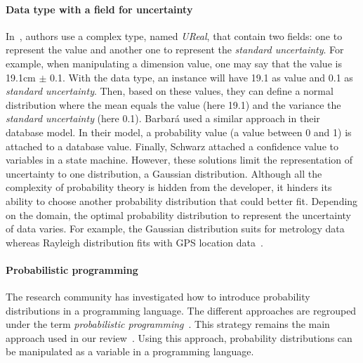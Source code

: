 \paragraph{Data type with a field for uncertainty}
In~\cite{DBLP:conf/models/BurguenoBMV18, DBLP:conf/ecmdafa/BertoaMBBTV18, DBLP:conf/sle/MayerhoferWV16, DBLP:conf/quatic/VallecilloMO16}, authors use a complex type, named \textit{UReal}, that contain two fields: one to represent the value and another one to represent the \textit{standard uncertainty}.
For example, when manipulating a dimension value, one may say that the value is 19.1cm $\pm$ 0.1. 
With the data type, an instance will have 19.1 as value and 0.1 as \textit{standard uncertainty}.
Then, based on these values, they can define a normal distribution where the mean equals the value (here 19.1) and the variance the \textit{standard uncertainty} (here 0.1).
Barbará \etal \cite{DBLP:journals/tkde/BarbaraGP92} used a similar approach in their database model.
In their model, a probability value (a value between 0 and 1) is attached to a database value.
Finally, Schwarz \etal \cite{DBLP:conf/uist/SchwarzMH11} attached a confidence value to variables in a state machine.
However, these solutions limit the representation of uncertainty to one distribution, \eg a Gaussian distribution.
Although all the complexity of probability theory is hidden from the developer, it hinders its ability to choose another probability distribution that could better fit.
Depending on the domain, the optimal probability distribution to represent the uncertainty of data varies. 
For example, the Gaussian distribution suits for metrology data~\cite{metrology2008evaluation} whereas Rayleigh distribution fits with GPS location data~\cite{bornholt2013abstractions}.

\paragraph{Probabilistic programming}
The research community has investigated how to introduce probability distributions in a programming language.
The different approaches are regrouped under the term \textit{probabilistic programming}~\cite{DBLP:conf/icse/GordonHNR14}.
This strategy remains the main approach used in our review~\cite{baudin2017openturns, DBLP:conf/asplos/BornholtMM14, DBLP:journals/corr/BorgstromGGMG13, osti_1430202, DBLP:journals/peerj-cs/SalvatierWF16, DBLP:conf/popl/BhatAVG12, DBLP:conf/aistats/ChagantyNR13, DBLP:journals/siamsc/JaroszewiczK12, DBLP:journals/toplas/ParkPT08, DBLP:conf/ijcai/Pfeffer01, DBLP:conf/popl/RamseyP02, DBLP:conf/pldi/SankaranarayananCG13, DBLP:conf/icra/Thrun00, DBLP:journals/sac/LunnTBS00, plummer2003jags}.
Using this approach, probability distributions can be manipulated as a variable in a programming language.

